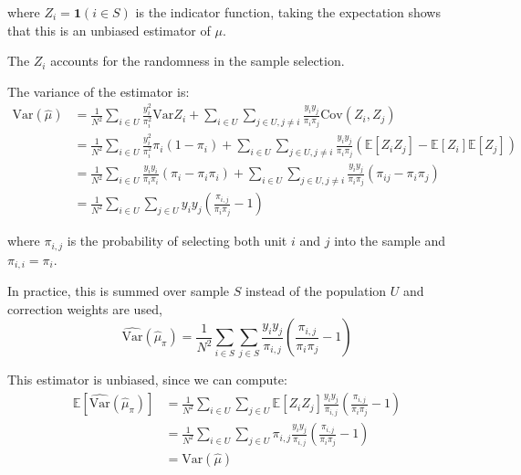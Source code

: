 \documentclass{article}
\begin{document}
where $Z_i=\mathbf{1}(i\in S)$ is the indicator function, taking the expectation shows that this is an unbiased estimator of $\mu$.    

\begin{remark}
    The $Z_i$ accounts for the randomness in the sample selection.
\end{remark}

The variance of the estimator is:
\begin{align*}
    \mathrm{Var}(\hat{\mu}) &=  \frac{1}{N^2} \sum_{i\in U}\frac{y_{i}^{2}}{\pi_{i}^{2}}\mathrm{Var}Z_{i}+\sum_{i\in U}\sum_{j\in U,j\neq i}\frac{y_{i}y_{j}}{\pi_{i}\pi_{j}}\mathrm{Cov}(Z_{i},Z_{j})\\
    &= \frac{1}{N^2} \sum_{i\in U}\frac{y_{i}^{2}}{\pi_{i}^{2}}\pi_i(1-\pi_i)+\sum_{i\in U}\sum_{j\in U,j\neq i}\frac{y_{i}y_{j}}{\pi_{i}\pi_{j}}(\mathbb{E}[Z_iZ_j]-\mathbb{E}[Z_i]\mathbb{E}[Z_j])\\
    &=\frac{1}{N^2} \sum_{i\in U}\frac{y_{i}y_i}{\pi_{i}\pi_i}(\pi_i-\pi_i\pi_i)+\sum_{i\in U}\sum_{j\in U,j\neq i}\frac{y_{i}y_{j}}{\pi_{i}\pi_{j}}(\pi_{ij} - \pi_i \pi_j)\\
    &=\frac{1}{N^2}\sum_{i\in U}\sum_{j\in U}y_{i}y_{j}\left({\frac{\pi_{i,j}}{\pi_{i}\pi_{j}}}-1\right)
\end{align*}

where $\pi_{i,j}$ is the probability of selecting both unit $i$ and $j$ into the sample and  $\pi_{i,i}=\pi_{i}$. 

In practice, this is summed over sample $S$ instead of the population $U$ and correction weights are used, 
\begin{equation}
    \widehat{\mathrm{Var}}\left(\hat{\mu}_{\pi}\right)=\frac{1}{N^2}\sum_{i\in S}\sum_{j\in S}\frac{y_{i}y_{j}}{\pi_{i,j}}\left(\frac{\pi_{i,j}}{\pi_{i}\pi_{j}}-1\right)
\end{equation}

This estimator is unbiased, since we can compute:
\begin{align*}
    \mathbb{E}[\widehat{\mathrm{Var}}\left(\hat{\mu}_{\pi}\right)] &= \frac{1}{N^2}\sum_{i\in U}\sum_{j\in U}\mathbb{E}[Z_i Z_j] \frac{y_{i}y_{j}}{\pi_{i,j}}\left(\frac{\pi_{i,j}}{\pi_{i}\pi_{j}}-1\right)\\
    &= \frac{1}{N^2}\sum_{i\in U}\sum_{j\in U}\pi_{i,j} \frac{y_{i}y_{j}}{\pi_{i,j}}\left(\frac{\pi_{i,j}}{\pi_{i}\pi_{j}}-1\right)\\
    &= \mathrm{Var}(\hat{\mu})
\end{align*}
\end{document}
